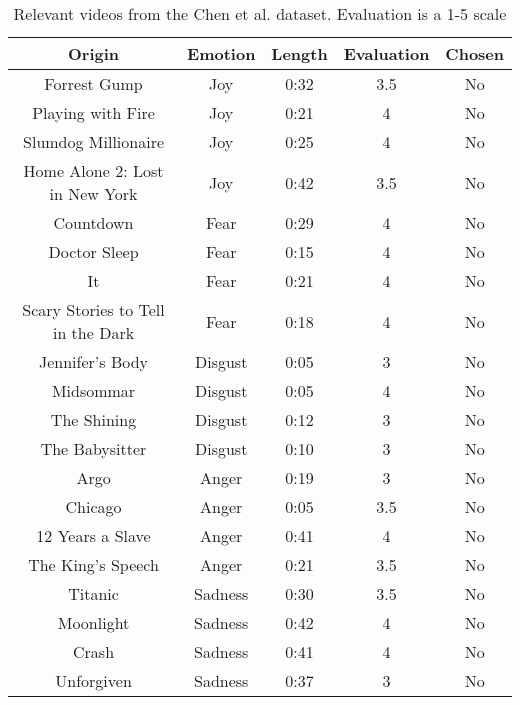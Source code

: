 \begin{table}[]
    \centering
    \begin{tabular}{|c|c|c|c|c|}
        \hline
        Origin & Emotion & Length & Evaluation  & Chosen  \\ \hline
        Forrest Gump & Joy & 0:32 & 3.5 & No \\ \hline
        Playing with Fire & Joy & 0:21 & 4 & No \\ \hline
        Slumdog Millionaire & Joy & 0:25 & 4 & No \\ \hline
        Home Alone 2: Lost in New York & Joy & 0:42 & 3.5 & No \\ \hline
        Countdown & Fear & 0:29 & 4 & No \\ \hline
        Doctor Sleep & Fear & 0:15 & 4 & No \\ \hline
        It & Fear & 0:21 & 4 & No \\ \hline
        Scary Stories to Tell in the Dark & Fear & 0:18 & 4 & No \\ \hline
        Jennifer's Body & Disgust & 0:05 & 3 & No \\ \hline
        Midsommar & Disgust & 0:05 & 4 & No \\ \hline
        The Shining & Disgust & 0:12 & 3 & No \\ \hline
        The Babysitter & Disgust & 0:10 & 3 & No \\ \hline
        Argo & Anger & 0:19 & 3 & No \\ \hline
        Chicago & Anger & 0:05 & 3.5 & No \\ \hline
        12 Years a Slave & Anger & 0:41 & 4 & No \\ \hline
        The King's Speech & Anger & 0:21 & 3.5 & No \\ \hline
        Titanic & Sadness & 0:30 & 3.5 & No \\ \hline
        Moonlight & Sadness & 0:42 & 4 & No \\ \hline
        Crash & Sadness & 0:41 & 4 & No \\ \hline
        Unforgiven & Sadness & 0:37 & 3 & No \\ \hline
    \end{tabular}
    \caption{Relevant videos from the Chen et al. dataset. Evaluation is a 1-5 scale \cite{CHEN2021106662}}
    \label{tab:my_label}
\end{table}

